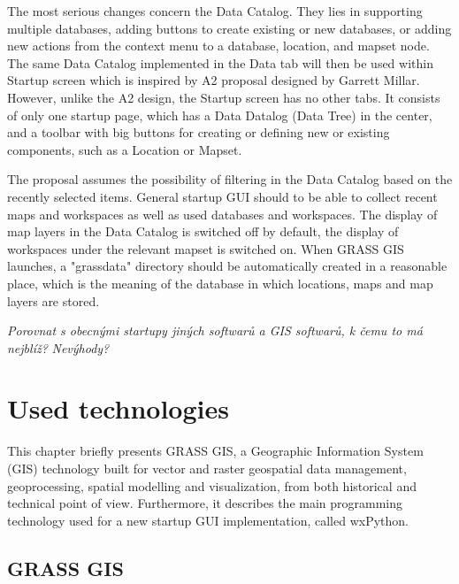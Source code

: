 \documentclass[a4paper,10pt,twoside]{article}
\begin{document}
The most serious changes concern the Data Catalog. They lies in supporting multiple databases, adding buttons to create existing or new databases, or adding new actions from the context menu to a database, location, and mapset node. The same Data Catalog implemented in the Data tab will then be used within Startup screen which is inspired by A2 proposal designed by Garrett Millar. However, unlike the A2 design, the Startup screen has no other tabs. It consists of only one startup page, which has a Data Datalog (Data Tree) in the center, and a toolbar with big buttons for creating or defining new or existing components, such as a Location or Mapset. 

The proposal assumes the possibility of filtering in the Data Catalog based on the recently selected items. General startup GUI should to be able to collect recent maps and workspaces as well as used databases and workspaces. The display of map layers in the Data Catalog is switched off by default, the display of workspaces under the relevant mapset is switched on. When GRASS GIS launches, a "grassdata" directory should be automatically created in a reasonable place, which is the meaning of the database in which locations, maps and map layers are stored.

\textit{\color{red} Porovnat s obecnými startupy jiných softwarů a GIS softwarů, k čemu to má nejblíž?}
\textit{\color{red} Nevýhody?}


\newpage
\vspace*{-1cm}
\section{Used technologies}
\noindent
\large

\noindent This chapter briefly presents GRASS GIS, a Geographic Information System (GIS) technology built for vector and raster geospatial data management, geoprocessing, spatial modelling and visualization, from both historical and technical point of view. Furthermore, it describes the main programming technology used for a new startup GUI implementation, called wxPython.

\subsection{GRASS GIS}
\noindent
\large
\end{document}
